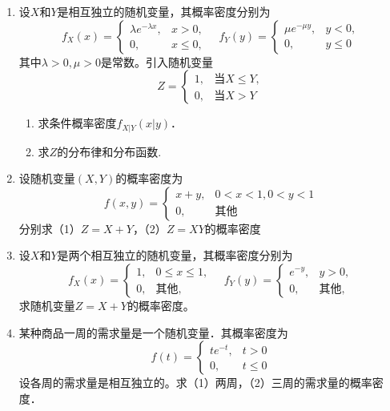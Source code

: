 \documentclass[10pt,a4paper]{article}
\begin{document}
\begin{enumerate}
    \item 设$X$和$Y$是相互独立的随机变量，其概率密度分别为
    $$f_X(x)=\left\{\begin{array}{ll}
        \lambda e^{-\lambda x}, & x>0,\\
        0, & x\leq 0,
    \end{array}\right.\quad
    f_Y(y)=\left\{\begin{array}{ll}
        \mu e^{-\mu y}, & y<0,\\
        0, & y\leq 0
    \end{array}\right.$$
    其中$\lambda>0,\mu>0$是常数。引入随机变量
    $$Z=\left\{\begin{array}{ll}
        1, & \mbox{当}X\leq Y,\\
        0, & \mbox{当}X>Y
    \end{array}\right.$$
    \begin{enumerate}
        \item 求条件概率密度$f_{X|Y}(x|y)$．
        \item 求$Z$的分布律和分布函数.
    \end{enumerate}
    \vspace{10cm}
     


    \item 设随机变量$(X,Y)$的概率密度为
    $$f(x,y)=\left\{\begin{array}{ll}
        x+y, & 0<x<1,0<y<1\\
        0, & \mbox{其他}
    \end{array}\right.$$
    分别求（1）$Z=X+Y$，（2）$Z=XY$的概率密度
    \clearpage



    \item 设$X$和$Y$是两个相互独立的随机变量，其概率密度分别为
    $$f_X(x)=\left\{\begin{array}{ll}
        1, & 0\leq x\leq 1,\\
        0, & \mbox{其他},
    \end{array}\right.\quad
    f_Y(y)=\left\{\begin{array}{ll}
        e^{-y}, & y>0,\\
        0, & \mbox{其他},
    \end{array}\right.$$
    求随机变量$Z=X+Y$的概率密度。
    \clearpage

     
    \item 某种商品一周的需求量是一个随机变量．其概率密度为
    $$f(t)=\left\{\begin{array}{ll}
        te^{-t}, & t>0\\
        0, & t\leq 0 
    \end{array}\right.$$
    设各周的需求量是相互独立的。求（1）两周，（2）三周的需求量的概率密度．
    \clearpage


\end{enumerate}
\end{document}
